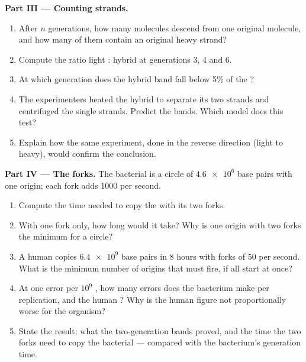\begin{problem}
\medskip
\noindent\textbf{Part III --- Counting strands.}
\begin{enumerate}[resume]
  \item After $n$ generations, how many  molecules descend from one
        original molecule, and how many of them contain an original
        heavy strand?
  \item Compute the ratio light : hybrid at generations 3, 4 and 6.
  \item At which generation does the hybrid band fall below 5\% of the
        ?
  \item The experimenters heated the hybrid  to separate its two
        strands and centrifuged the single strands. Predict the bands.
        Which model does this test?
  \item Explain how the same experiment, done in the reverse direction
        (light to heavy), would confirm the conclusion.
\end{enumerate}

\medskip
\noindent\textbf{Part IV --- The forks.}
The bacterial  is a circle of $\num{4.6e6}$ base pairs with
one origin; each fork adds 1000  per second.
\begin{enumerate}[resume]
  \item Compute the time needed to copy the  with its two
        forks.
  \item With one fork only, how long would it take? Why is one origin
        with two forks the minimum for a circle?
  \item A human  copies $\num{6.4e9}$ base pairs in 8 hours with
        forks of 50  per second. What is the minimum number of
        origins that must fire, if all start at once?
  \item At one error per $10^9$ , how many errors does the
        bacterium make per replication, and the human ? Why is the
        human figure not proportionally worse for the organism?
  \item State the result: what the two-generation bands proved, and
        the time the two forks need to copy the bacterial 
        --- compared with the bacterium's generation time.
\end{enumerate}
\end{problem}
